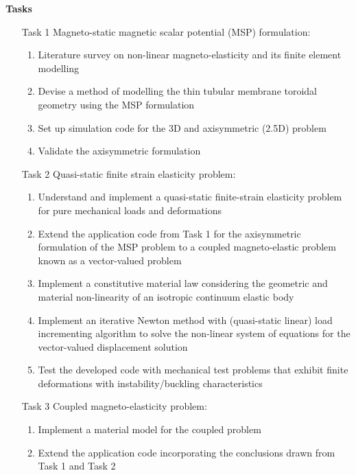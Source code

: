 \begin{center}
\Huge \bf Tasks
\end{center}

\begin{enumerate}
\item[Task 1] Magneto-static magnetic scalar potential (MSP) formulation:
\begin{enumerate}
\item Literature survey on non-linear magneto-elasticity and its finite element modelling \cite{dorfmann2004, dorfmann2005, reddy_toroid, barham}
\item Devise a method of modelling the thin tubular membrane toroidal geometry using the MSP formulation 
\item Set up simulation code for the 3D and axisymmetric (2.5D) problem
\item Validate the axisymmetric formulation 
\end{enumerate}
\item[Task 2] Quasi-static finite strain elasticity problem:
\begin{enumerate}
\item Understand and implement a quasi-static finite-strain elasticity problem for pure mechanical loads and deformations \cite{Pelteret2016a, Pelteret2012}
\item Extend the application code from Task 1 for the axisymmetric formulation of the MSP problem to a coupled magneto-elastic problem known as a vector-valued problem
\item Implement a constitutive material law considering the geometric and material non-linearity of an isotropic continuum elastic body \cite{Wriggers2008}
\item Implement an iterative Newton method with (quasi-static linear) load incrementing algorithm to solve the non-linear system of equations for the vector-valued displacement solution
\item Test the developed code with mechanical test problems that exhibit finite deformations with instability/buckling characteristics
\end{enumerate}
\item[Task 3] Coupled magneto-elasticity problem:
\begin{enumerate}
\item Implement a material model for the coupled problem \cite{pelteret2016, Saxena2015}
\item Extend the application code incorporating the conclusions drawn from Task 1 and Task 2

\end{enumerate}
\end{enumerate}
